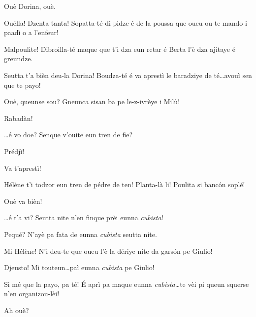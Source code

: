 \begin{drama}

\Dorinaspeaks{} Ouè Dorina, ouè.


\Djspeaks {} Ouélla! Dzenta tanta! Sopatta-té di pidze é de la poussa que oueu ou te mando i paadì o a l'enfeur!

\Dorinaspeaks Malpoulite! Dibroilla-té maque que t'i dza eun retar é Berta l’è dza ajitaye é greundze.

\Bertaspeaks Seutta t'a bièn deu-la Dorina!   Boudza-té é va aprestì le baradziye de té\ldots avouì sen que te payo!

\Djspeaks Ouè, queunse sou? Gneunca sisan ba pe le-z-ivrèye i Milù!

\Bertaspeaks Rabadàn!

\Bertaspeaks{} \ldots é vo doe? Senque v'ouite eun tren de fie?

\Helenespeaks Prédjì!

\Bertaspeaks{} Va t'aprestì!


\Bertaspeaks Hélène t'i todzor eun tren de pédre de ten! Planta-là li! Poulita si banc\'on soplé!

\Helenespeaks Ouè va bièn!

\Bertaspeaks \ldots é t'a vi? Seutta nite n'en finque prèi eunna \textit{cubista}!

\Helenespeaks Pequé? N'ayè pa fata de eunna \textit{cubista} seutta nite.

\Bertaspeaks Mi Hélène! N'i deu-te que oueu l'è la dériye nite da gars\'on pe Giulio!

\Helenespeaks Djeusto! Mi touteun\ldots paì eunna \textit{cubista} pe Giulio!

\Bertaspeaks Si mé que la payo, pa té! \'E aprì pa maque eunna \textit{cubista}\ldots te vèi pi queun squerse n'en organizou-lèi!

\Helenespeaks Ah ouè?





\end{drama}
